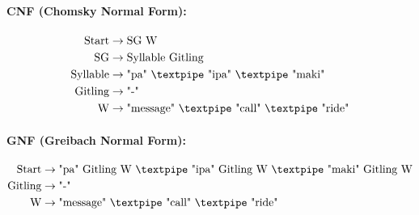\paragraph{CNF (Chomsky Normal Form):}

\begin{equation*}
    \begin{aligned}
        \text{Start}   & \rightarrow \text{SG W} \\
        \text{SG}      & \rightarrow \text{Syllable Gitling}\\
        \text{Syllable}    & \rightarrow \text{"pa" {\textpipe} "ipa" {\textpipe} "maki"}\\        
        \text{Gitling} & \rightarrow \text{"-"}\\
        \text{W} & \rightarrow \text{"message" {\textpipe} "call" {\textpipe} "ride"}   \\
    \end{aligned}
\end{equation*}

\paragraph{GNF (Greibach Normal Form):}

\begin{equation*}
    \begin{aligned}
        \text{Start}   & \rightarrow \text{"pa" Gitling W {\textpipe} "ipa" Gitling W {\textpipe} "maki" Gitling W}\\
        \text{Gitling} & \rightarrow \text{"-"}\\
        \text{W} & \rightarrow \text{"message" {\textpipe} "call" {\textpipe} "ride"}   \\
    \end{aligned}
\end{equation*}